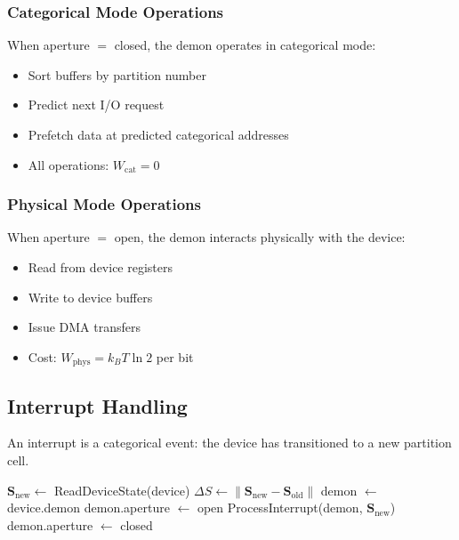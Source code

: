 \documentclass[twocolumn,10pt]{article}
\theoremstyle{definition}
\theoremstyle{remark}
\newcommand{\Scoord}{\mathbf{S}}
\begin{document}
\subsubsection{Categorical Mode Operations}

When aperture $= $ closed, the demon operates in categorical mode:
\begin{itemize}
    \item Sort buffers by partition number
    \item Predict next I/O request
    \item Prefetch data at predicted categorical addresses
    \item All operations: $W_{\text{cat}} = 0$
\end{itemize}

\subsubsection{Physical Mode Operations}

When aperture $= $ open, the demon interacts physically with the device:
\begin{itemize}
    \item Read from device registers
    \item Write to device buffers
    \item Issue DMA transfers
    \item Cost: $W_{\text{phys}} = k_B T \ln 2$ per bit
\end{itemize}

\subsection{Interrupt Handling}

An interrupt is a categorical event: the device has transitioned to a new partition cell.

\begin{algorithm}
\caption{Handle Interrupt}
\begin{algorithmic}[1]
    \State $\Scoord_{\text{new}} \gets$ ReadDeviceState(device)
    \State $\Delta S \gets \|\Scoord_{\text{new}} - \Scoord_{\text{old}}\|$
        \State demon $\gets$ device.demon
        \State demon.aperture $\gets$ open
        \State ProcessInterrupt(demon, $\Scoord_{\text{new}}$)
        \State demon.aperture $\gets$ closed
    \EndIf
\EndFunction
\end{algorithmic}
\end{algorithm}
\end{document}

